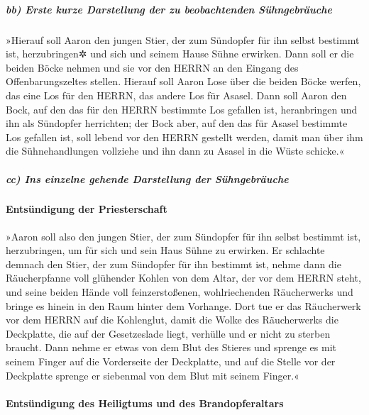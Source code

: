 \hypertarget{bb-erste-kurze-darstellung-der-zu-beobachtenden-suxfchngebruxe4uche}{%
\subparagraph{bb) Erste kurze Darstellung der zu beobachtenden
Sühngebräuche}\label{bb-erste-kurze-darstellung-der-zu-beobachtenden-suxfchngebruxe4uche}}

»Hierauf soll Aaron den jungen Stier, der zum Sündopfer
für ihn selbst bestimmt ist, herzubringen✲ und sich und seinem Hause
Sühne erwirken. Dann soll er die beiden Böcke nehmen und
sie vor den HERRN an den Eingang des Offenbarungszeltes stellen.
Hierauf soll Aaron Lose über die beiden Böcke werfen, das
eine Los für den HERRN, das andere Los für Asasel. Dann
soll Aaron den Bock, auf den das für den HERRN bestimmte Los gefallen
ist, heranbringen und ihn als Sündopfer herrichten; der
Bock aber, auf den das für Asasel bestimmte Los gefallen ist, soll
lebend vor den HERRN gestellt werden, damit man über ihm die
Sühnehandlungen vollziehe und ihn dann zu Asasel in die Wüste schicke.«

\hypertarget{cc-ins-einzelne-gehende-darstellung-der-suxfchngebruxe4uche}{%
\subparagraph{cc) Ins einzelne gehende Darstellung der
Sühngebräuche}\label{cc-ins-einzelne-gehende-darstellung-der-suxfchngebruxe4uche}}

\hypertarget{entsuxfcndigung-der-priesterschaft}{%
\paragraph{Entsündigung der
Priesterschaft}\label{entsuxfcndigung-der-priesterschaft}}

»Aaron soll also den jungen Stier, der zum Sündopfer für
ihn selbst bestimmt ist, herzubringen, um für sich und sein Haus Sühne
zu erwirken. Er schlachte demnach den Stier, der zum Sündopfer für ihn
bestimmt ist, nehme dann die Räucherpfanne voll glühender
Kohlen von dem Altar, der vor dem HERRN steht, und seine beiden Hände
voll feinzerstoßenen, wohlriechenden Räucherwerks und bringe es hinein
in den Raum hinter dem Vorhange. Dort tue er das
Räucherwerk vor dem HERRN auf die Kohlenglut, damit die Wolke des
Räucherwerks die Deckplatte, die auf der Gesetzeslade liegt, verhülle
und er nicht zu sterben braucht. Dann nehme er etwas von
dem Blut des Stieres und sprenge es mit seinem Finger auf die
Vorderseite der Deckplatte, und auf die Stelle vor der Deckplatte
sprenge er siebenmal von dem Blut mit seinem Finger.«

\hypertarget{entsuxfcndigung-des-heiligtums-und-des-brandopferaltars}{%
\paragraph{Entsündigung des Heiligtums und des
Brandopferaltars}\label{entsuxfcndigung-des-heiligtums-und-des-brandopferaltars}}

